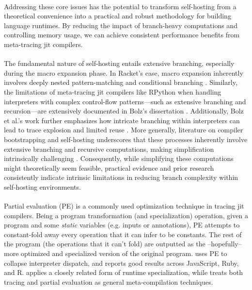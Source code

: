   \paragraph{}%
    Addressing these core issues has the potential to transform self-hosting from a theoretical convenience into a practical and robust methodology for building language runtimes. By reducing the impact of branch-heavy computations and controlling memory usage, we can achieve consistent performance benefits from meta-tracing \gls{jit} compilers.

  \paragraph{}%
    The fundamental nature of self-hosting entails extensive branching, especially during the macro expansion phase. In Racket's case, macro expansion inherently involves deeply nested pattern-matching and conditional branching \cite{icfp2019}. Similarly, the limitations of meta-tracing \gls{jit} compilers like RPython when handling interpreters with complex control-flow patterns—such as extensive branching and recursion—are extensively documented in Bolz's dissertation \cite{bolzPhDThesis}. Additionally, Bolz et al.'s work further emphasizes how intricate branching within interpreters can lead to trace explosion and limited reuse \cite{pypy-main}. More generally, literature on compiler bootstrapping and self-hosting underscores that these processes inherently involve extensive branching and recursive computations, making simplification intrinsically challenging \cite{appelCompilingContinuations2007}. Consequently, while simplifying these computations might theoretically seem feasible, practical evidence and prior research consistently indicate intrinsic limitations in reducing branch complexity within self-hosting environments.


  \paragraph{}%
    Partial evaluation (PE) is a commonly used optimization technique in tracing \gls{jit} compilers. Being a program transformation (and specialization) operation, given a program and some \emph{static} variables (e.g. inputs or annotations), PE attempts to constant-fold away every operation that it can infer to be constants. The rest of the program (the operations that it can't fold) are outputted as the --hopefully-- more optimized and specialized version of the original program. \cite{truffle-graal} uses PE to collapse interpreter dispatch, and \cite{practical-partial} reports good results across JavaScript, Ruby, and R.  \cite{traceMonkey} applies a closely related form of runtime specialization, while \cite{trace-vs-PE} treats both tracing and partial evaluation as general meta-compilation techniques.

